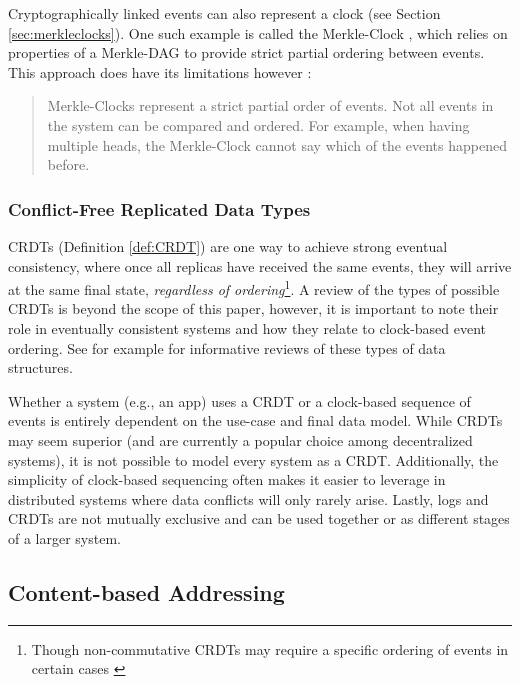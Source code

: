 \documentclass{textile}
\begin{document}
Cryptographically linked events can also represent a clock (see Section \ref{sec:merkleclocks}). One such example is called the Merkle-Clock \cite{sanjuanMerkleCRDTs2019}, which relies on properties of a Merkle-DAG to provide strict partial ordering between events. This approach does have its limitations however \cite[sec. 4.3]{sanjuanMerkleCRDTs2019}:

\begin{quote}
Merkle-Clocks represent a strict partial order of events. Not all events in the system can be compared and ordered. For example, when having multiple heads, the Merkle-Clock cannot say which of the events happened before.
\end{quote}

\subsubsection{Conflict-Free Replicated Data Types}\label{sec:CRDTs}

CRDTs (Definition \ref{def:CRDT}) are one way to achieve strong eventual consistency, where once all replicas have received the same events, they will arrive at the same final state, \emph{regardless of ordering}\footnote{Though non-commutative CRDTs may require a specific ordering of events in certain cases \cite{sanjuanMerkleCRDTs2019}}. A review of the types of possible CRDTs is beyond the scope of this paper, however, it is important to note their role in eventually consistent systems and how they relate to clock-based event ordering. See for example \cite{enesSingleWriterPrincipleCRDT2017,sanjuanMerkleCRDTs2019} for informative reviews of these types of data structures.

Whether a system (e.g., an app) uses a CRDT or a clock-based sequence of events is entirely dependent on the use-case and final data model. While CRDTs may seem superior (and are currently a popular choice among decentralized systems), it is not possible to model every system as a CRDT. Additionally, the simplicity of clock-based sequencing often makes it easier to leverage in distributed systems where data conflicts will only rarely arise. Lastly, logs and CRDTs are not mutually exclusive and can be used together or as different stages of a larger system.

\subsection{Content-based Addressing}
\end{document}
